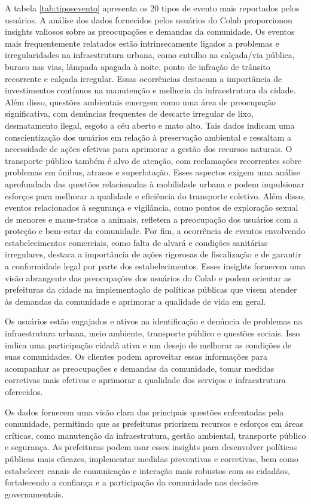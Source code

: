 A tabela \autoref{tab:tiposevento} apresenta os 20 tipos de evento mais reportados pelos usuários. A análise dos dados fornecidos pelos usuários do Colab proporcionou insights valiosos sobre as preocupações e demandas da comunidade. Os eventos mais frequentemente relatados estão intrinsecamente ligados a problemas e irregularidades na infraestrutura urbana, como entulho na calçada/via pública, buraco nas vias, lâmpada apagada à noite, ponto de infração de trânsito recorrente e calçada irregular. Essas ocorrências destacam a importância de investimentos contínuos na manutenção e melhoria da infraestrutura da cidade. Além disso, questões ambientais emergem como uma área de preocupação significativa, com denúncias frequentes de descarte irregular de lixo, desmatamento ilegal, esgoto a céu aberto e mato alto. Tais dados indicam uma conscientização dos usuários em relação à preservação ambiental e ressaltam a necessidade de ações efetivas para aprimorar a gestão dos recursos naturais. O transporte público também é alvo de atenção, com reclamações recorrentes sobre problemas em ônibus, atrasos e superlotação. Esses aspectos exigem uma análise aprofundada das questões relacionadas à mobilidade urbana e podem impulsionar esforços para melhorar a qualidade e eficiência do transporte coletivo. Além disso, eventos relacionados à segurança e vigilância, como pontos de exploração sexual de menores e maus-tratos a animais, refletem a preocupação dos usuários com a proteção e bem-estar da comunidade. Por fim, a ocorrência de eventos envolvendo estabelecimentos comerciais, como falta de alvará e condições sanitárias irregulares, destaca a importância de ações rigorosas de fiscalização e de garantir a conformidade legal por parte dos estabelecimentos. Esses insights fornecem uma visão abrangente das preocupações dos usuários do Colab e podem orientar as prefeituras da cidade na implementação de políticas públicas que visem atender às demandas da comunidade e aprimorar a qualidade de vida em geral.

Os usuários estão engajados e ativos na identificação e denúncia de problemas na infraestrutura urbana, meio ambiente, transporte público e questões sociais. Isso indica uma participação cidadã ativa e um desejo de melhorar as condições de suas comunidades.
Os clientes podem aproveitar essas informações para acompanhar as preocupações e demandas da comunidade, tomar medidas corretivas mais efetivas e aprimorar a qualidade dos serviços e infraestrutura oferecidos.

Os dados fornecem uma visão clara das principais questões enfrentadas pela comunidade, permitindo que as prefeituras priorizem recursos e esforços em áreas críticas, como manutenção da infraestrutura, gestão ambiental, transporte público e segurança. As prefeituras podem usar esses insights para desenvolver políticas públicas mais eficazes, implementar medidas preventivas e corretivas, bem como estabelecer canais de comunicação e interação mais robustos com os cidadãos, fortalecendo a confiança e a participação da comunidade nas decisões governamentais.

